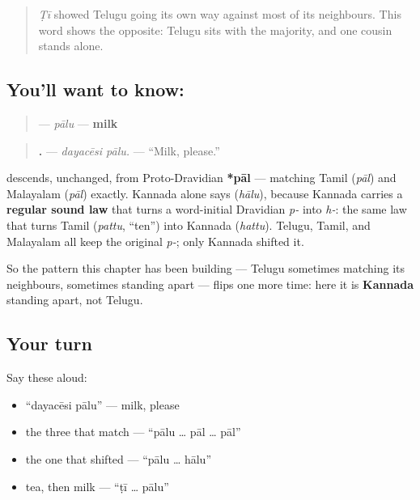\label{lesson:TE-C39-paalu}



\begin{quote}
\emph{Ṭī} showed Telugu going its own way against most of its neighbours. This word shows the opposite: Telugu sits with the majority, and one cousin stands alone.
\end{quote}

\subsection*{You'll want to know: }
\begin{quote}
\textbf{} — \emph{pālu} — \textbf{milk}
\end{quote}

\begin{quote}
\textbf{ .} — \emph{dayacēsi pālu.} — \textquotedblleft{}Milk, please.\textquotedblright{}
\end{quote}

\begin{cousinweb}
\textbf{} descends, unchanged, from Proto-Dravidian \textbf{*pāl} — matching Tamil \textbf{} (\emph{pāl}) and Malayalam \textbf{} (\emph{pāl}) exactly. Kannada alone says \textbf{} (\emph{hālu}), because Kannada carries a \textbf{regular sound law} that turns a word-initial Dravidian \emph{p-} into \emph{h-}: the same law that turns Tamil \textbf{} (\emph{pattu}, \textquotedblleft{}ten\textquotedblright{}) into Kannada \textbf{} (\emph{hattu}). Telugu, Tamil, and Malayalam all keep the original \emph{p-}; only Kannada shifted it.

So the pattern this chapter has been building — Telugu sometimes matching its neighbours, sometimes standing apart — flips one more time: here it is \textbf{Kannada} standing apart, not Telugu.
\end{cousinweb}

\subsection*{Your turn}
Say these aloud:

\begin{itemize}
\raggedright
  \item \textquotedblleft{}dayacēsi pālu\textquotedblright{} — milk, please
  \item the three that match — \textquotedblleft{}pālu … pāl … pāl\textquotedblright{}
  \item the one that shifted — \textquotedblleft{}pālu … hālu\textquotedblright{}
  \item tea, then milk — \textquotedblleft{}ṭī … pālu\textquotedblright{}
\end{itemize}


